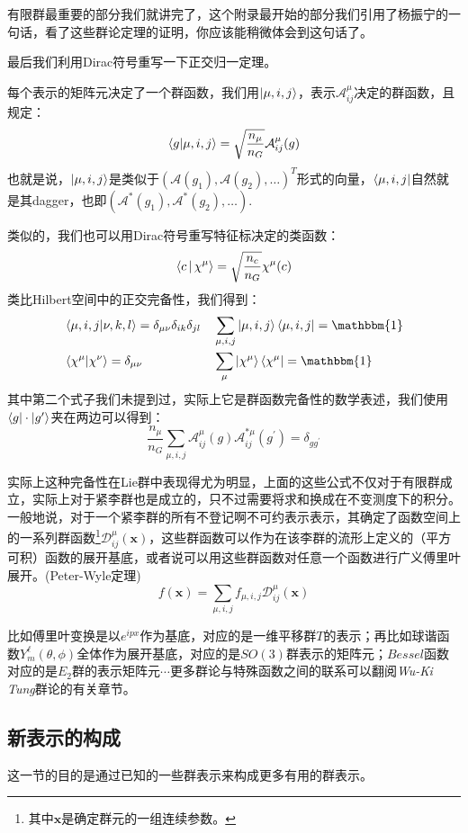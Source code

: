 有限群最重要的部分我们就讲完了，这个附录最开始的部分我们引用了杨振宁的一句话，看了这些群论定理的证明，你应该能稍微体会到这句话了。

最后我们利用Dirac符号重写一下正交归一定理。

每个表示的矩阵元决定了一个群函数，我们用$\ket{\mu,i,j}$，表示$\mathcal{A}^\mu_{ij}$决定的群函数，且规定：
\[\braket{g|\mu,i,j}=\sqrt{\frac{n_\mu}{n_G}}\mathcal{A}^\mu_{ij}(g)\]
也就是说，$\ket{\mu,i,j}$是类似于$(\mathcal A(g_1),\mathcal A(g_2),\ldots)^T$形式的向量，$\bra{\mu,i,j}$自然就是其dagger，也即$(\mathcal {A}^*(g_1),\mathcal {A}^*(g_2),\ldots)$.

类似的，我们也可以用Dirac符号重写特征标决定的类函数：
\[\Braket{c|\chi^\mu}=\sqrt{\frac{n_c}{n_G}}\chi^\mu(c)\]
类比Hilbert空间中的正交完备性，我们得到：
\begin{align}
	&\braket{\mu,i,j|\nu,k,l}=\delta_{\mu\nu}\delta_{ik}\delta_{jl}&&\sum_{\mu,i,j} \ket{\mu,i,j}\bra{\mu,i,j}=\mathbbm{1}\\
	&\braket{\chi^\mu|\chi^\nu}=\delta_{\mu\nu}&&\sum_{\mu}\ket{\chi^\mu}\bra{\chi^\mu}=\mathbbm{1}
\end{align}
其中第二个式子我们未提到过，实际上它是群函数完备性的数学表述，我们使用$\braket{g|\cdot|g^\prime}$夹在两边可以得到：
\begin{equation}
	\boxed{
	\frac{n_\mu}{n_G}\sum_{\mu,i,j}\mathcal{A}^\mu_{ij}(g)\mathcal{A}^{*\mu}_{ij}(g^\prime)=\delta_{gg^\prime}
}
\end{equation}

实际上这种完备性在Lie群中表现得尤为明显，上面的这些公式不仅对于有限群成立，实际上对于紧李群也是成立的，只不过需要将求和换成在不变测度下的积分。一般地说，对于一个紧李群的所有不登记啊不可约表示表示，其确定了函数空间上的一系列群函数\footnote{其中$\mathbf{x}$是确定群元的一组连续参数。}$\mathcal{D}^\mu_{ij}(\mathbf{x})$，这些群函数可以作为在该李群的流形上定义的（平方可积）函数的展开基底，或者说可以用这些群函数对任意一个函数进行广义傅里叶展开。(Peter-Wyle定理)
\begin{equation}
	f(\mathbf{x})=\sum_{\mu,i,j}f_{\mu,i,j}\mathcal{D}^\mu_{ij}(\mathbf{x})
\end{equation}

比如傅里叶变换是以$e^{ipx}$作为基底，对应的是一维平移群$T$的表示；再比如球谐函数$Y^\ell_m(\theta,\phi)$全体作为展开基底，对应的是$SO(3)$群表示的矩阵元；$Bessel$函数对应的是$E_2$群的表示矩阵元$\cdots$更多群论与特殊函数之间的联系可以翻阅{\itshape Wu-Ki Tung}群论的有关章节。

\subsection{新表示的构成}
这一节的目的是通过已知的一些群表示来构成更多有用的群表示。

